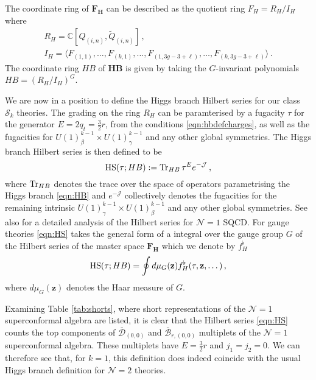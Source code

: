 \documentclass[main.tex]{subfiles}
\begin{document}
The coordinate ring of $\mathbf{F_H}$ can be described as the quotient ring $F_H=R_H/I_H$ where
\begin{gather}
R_H=\mathbb{C}[Q_{(i,n)},\widetilde{Q}_{(i,n)}]\,,\\I_H=\langle F_{(1,1)},\dots,F_{(k,1)},\dots,F_{(1,3g-3+\ell)},\dots,F_{(k,3g-3+\ell)}\rangle\,.
\end{gather}
The coordinate ring $HB$ of $\mathbf{HB}$ is given by taking the $G$-invariant polynomials $HB=(R_H/I_H)^G$.

We are now in a position to define the Higgs branch Hilbert series for our class $\mathcal{S}_k$ theories. The grading on the ring $R_H$ can be paramterised by a fugacity $\tau$ for the generator $E=2q_t=\frac{3}{2}r$, from the conditions \eqref{eqn:hbdefcharges}, as well as the fugacities for $U(1)^{k-1}_{\beta}\times U(1)^{k-1}_{\gamma}$ and any other global symmetries. The Higgs branch Hilbert series is then defined to be \cite{Feng:2007ur,Benvenuti:2006qr} 
\begin{equation}\label{eqn:HS}
\textrm{HS}(\tau;HB):=\operatorname{Tr}_{HB}\tau^Ee^{-\mathcal{J}}\,,
\end{equation}
where $\operatorname{Tr}_{HB}$ denotes the trace over the space of operators parametrising the Higgs branch \eqref{eqn:HB} and $e^{-\mathcal{J}}$ collectively denotes the fugacities for the remaining intrinsic $U(1)^{k-1}_{\gamma}\times  U(1)^{k-1}_{\beta}$ and any other global symmetries. See also \cite{Gray:2008yu,Hanany:2008kn} for a detailed analysis of the Hilbert series for $\mathcal{N}=1$ SQCD. 
For gauge theories \eqref{eqn:HS} takes the general form of a integral over the gauge group $G$ of the Hilbert series of the master space $\mathbf{F_H}$ which we denote by $f_H^{\flat}$ 
\begin{equation}
\textrm{HS}(\tau;HB)=\oint d\mu_G(\mathbf{z})f_H^{\flat}(\tau,\mathbf{z},\dots)\,,
\end{equation}
where $d\mu_G(\mathbf{z})$ denotes the Haar measure of $G$. 

Examining Table \ref{tab:shorts}, where short representations of the $\mathcal{N}=1$ superconformal algebra are listed, it is clear that the Hilbert series \eqref{eqn:HS} counts the top components of $\overline{\mathcal{D}}_{(0,0)}$ and $\overline{\mathcal{B}}_{r,(0,0)}$ multiplets of the $\mathcal{N}=1$ superconformal algebra. These multiplets have $E=\frac{3}{2}r$ and $j_1=j_2=0$. We can therefore see that, for $k=1$, this definition does indeed coincide with the usual Higgs branch definition for $\mathcal{N}=2$ theories.
\end{document}
